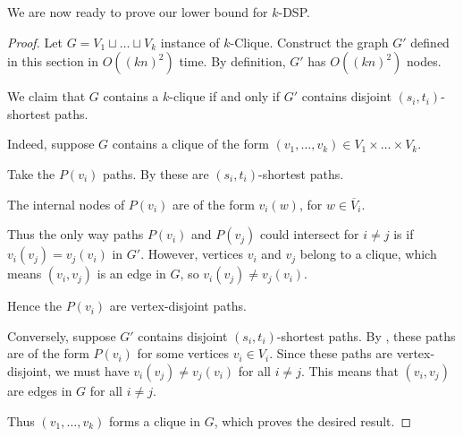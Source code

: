 \documentclass[11pt]{article}
\renewcommand{\bar}{\overline}
\theoremstyle{definition}
\newtheorem{lemma}[theorem]{Lemma}
\begin{document}
We are now ready to prove our lower bound for \textsf{$k$-DSP}.


\lbdspboth*
\begin{proof}
    Let $G = V_1\sqcup\dots\sqcup V_k$ instance of \textsf{$k$-Clique}.
    Construct the graph $G'$ defined in this section in $O((kn)^2)$ time.
    By definition, $G'$ has $O((kn)^2)$ nodes.
    
    We claim that $G$ contains a $k$-clique if and only if $G'$ contains disjoint $(s_i,t_i)$-shortest paths.

    Indeed, suppose $G$ contains a clique of the form $(v_1, \dots, v_k)\in V_1\times\dots\times V_k$.
    
    Take the $P(v_i)$ paths.
    By  these are $(s_i,t_i)$-shortest paths.
    
    The internal nodes of $P(v_i)$ are of the form $v_i(w)$, for $w\in \bar{V}_i$.
    
    Thus the only way paths $P(v_i)$ and $P(v_j)$ could intersect for $i\neq j$ is if $v_i(v_j) = v_j(v_i)$ in $G'$.
    However, vertices $v_i$ and $v_j$ belong to a clique, which means $(v_i,v_j)$ is an edge in $G$, so $v_i(v_j)\neq v_j(v_i)$.

    Hence the $P(v_i)$ are vertex-disjoint paths.

    Conversely, suppose $G'$ contains disjoint $(s_i,t_i)$-shortest paths.
    By , these paths are of the form $P(v_i)$ for some vertices $v_i\in V_i$.
    Since these paths are vertex-disjoint, we must have $v_i(v_j)\neq v_j(v_i)$ for all $i\neq j$.
    This means that $(v_i,v_j)$ are edges in $G$ for all $i\neq j$.
    
    Thus $(v_1,\dots, v_k)$ forms a clique in $G$, which proves the desired result.    
\end{proof}

\end{document}
